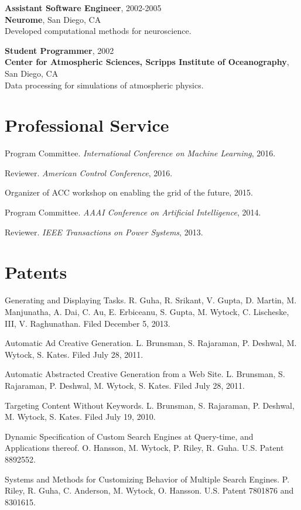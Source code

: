 \documentclass[margin, line]{res}
\begin{document}
\begin{resume}
{\bf Assistant Software Engineer}, 2002-2005 \\
{\bf Neurome}, San Diego, CA \\
Developed computational methods for neuroscience.

{\bf Student Programmer}, 2002 \\
{\bf Center for Atmospheric Sciences, Scripps Institute of Oceanography}, San
Diego, CA \\
Data processing for simulations of atmospheric physics.


\section{Professional Service}

Program Committee. \emph{International Conference on Machine Learning}, 2016.

Reviewer. \emph{American Control Conference}, 2016.

Organizer of ACC workshop on enabling the grid of the future, 2015.

Program Committee. \emph{AAAI Conference on Artificial Intelligence}, 2014.

Reviewer. \emph{IEEE Transactions on Power Systems}, 2013.

\section{Patents}

Generating and Displaying Tasks. R. Guha, R. Srikant, V. Gupta, D. Martin,
M. Manjunatha, A. Dai, C. Au,  E. Erbiceanu, S. Gupta, M. Wytock, C. Lischeske,
III, V. Raghunathan. Filed December 5, 2013.

Automatic Ad Creative Generation. L. Brunsman, S. Rajaraman, P. Deshwal,
M. Wytock, S. Kates. Filed July 28, 2011.

Automatic Abstracted Creative Generation from a Web Site. L. Brunsman,
S. Rajaraman, P. Deshwal, M. Wytock, S. Kates. Filed July 28, 2011.

Targeting Content Without Keywords. L. Brunsman, S. Rajaraman, P. Deshwal,
M. Wytock, S. Kates. Filed July 19, 2010.

Dynamic Specification of Custom Search Engines at Query-time, and Applications
thereof. O. Hansson, M. Wytock, P. Riley, R. Guha. U.S. Patent 8892552.

Systems and Methods for Customizing Behavior of Multiple Search
Engines. P. Riley, R. Guha, C. Anderson, M. Wytock, O. Hansson. U.S. Patent 7801876 and 8301615.

\end{resume}
\end{document}
